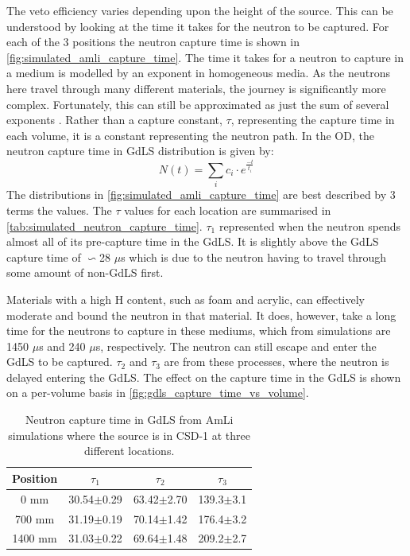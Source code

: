 \par
The veto efficiency varies depending upon the height of the source.
This can be understood by looking at the time it takes for the neutron to be captured.
For each of the 3 positions the neutron capture time is shown in \autoref{fig:simulated_amli_capture_time}.
The time it takes for a neutron to capture in a medium is modelled by an exponent in homogeneous media.
As the neutrons here travel through many different materials, the journey is significantly more complex.
Fortunately, this can still be approximated as just the sum of several exponents \cite{Dayabay_neutron_capture_fit_ref}.
Rather than a capture constant, $\tau$, representing the capture time in each volume, it is a constant representing the neutron path.
In the OD, the neutron capture time in GdLS distribution is given by:
\begin{equation}
    N(t) = \sum_{i} c_i \cdot e^{\frac{-t}{t_i}}
\label{eq:neutron_capture_time}
\end{equation}
The distributions in \autoref{fig:simulated_amli_capture_time} are best described by 3 terms the values.
The $\tau$ values for each location are summarised in \autoref{tab:simulated_neutron_capture_time}.
$\tau_1$ represented when the neutron spends almost all of its pre-capture time in the GdLS.
It is slightly above the GdLS capture time of $\backsim$28 $\mu$s \cite{ucsb_gdls_dicebox_simulations_ref} which is due to the neutron having to travel through some amount of non-GdLS first.
\par
Materials with a high H content, such as foam and acrylic, can effectively moderate and bound the neutron in that material.
It does, however, take a long time for the neutrons to capture in these mediums, which from simulations are 1450 $\mu$s and 240 $\mu$s, respectively.
The neutron can still escape and enter the GdLS to be captured.
$\tau_2$ and $\tau_3$ are from these processes, where the neutron is delayed entering the GdLS.
The effect on the capture time in the GdLS is shown on a per-volume basis in \autoref{fig:gdls_capture_time_vs_volume}.

\begin{table}[]
    \centering
    \begin{tabular}{c|c|c|c}
        Position  &  $\tau_1$      & $\tau_2$       & $\tau_3$        \\ \hline
        0 mm      & 30.54$\pm$0.29 & 63.42$\pm$2.70 & 139.3$\pm$3.1   \\ 
        700 mm    & 31.19$\pm$0.19 & 70.14$\pm$1.42 & 176.4$\pm$3.2   \\
        1400 mm   & 31.03$\pm$0.22 & 69.64$\pm$1.48 & 209.2$\pm$2.7         
    \end{tabular}
    \caption{Neutron capture time in GdLS from AmLi simulations where the source is in CSD-1 at three different locations.}
    \label{tab:simulated_neutron_capture_time}
\end{table}

